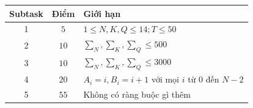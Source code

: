 \begin{center}
  \begin{tabular}{|c|c|l|} \hline
    \textbf{Subtask} & \textbf{Điểm} & \textbf{Giới hạn} \\ \hline
    1 & $5$ & $1\le N,K,Q\le 14; T\le 50$ \\ \hline
    2 & $10$ & $\sum_N,\sum_K,\sum_Q\le 500$ \\ \hline
    3 & $10$ & $\sum_N,\sum_K,\sum_Q\le 3000$ \\ \hline
    4 & $20$ & $A_i=i,B_i=i+1$ với mọi $i$ từ $0$ đến $N-2$ \\ \hline
    5 & $55$ & Không có ràng buộc gì thêm \\ \hline
  \end{tabular}
\end{center}